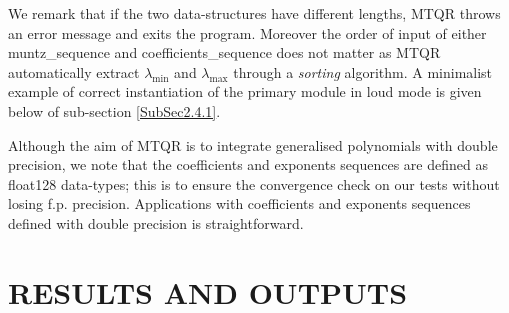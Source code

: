 \documentclass[a4paper, twosided]{book}
\begin{document}
\noindent
We remark that if the two data-structures have different lengths, MTQR throws an error message and exits the program. Moreover the order of input of either \colorbox{poliGrayBlue}{muntz\_sequence} and \colorbox{poliGrayBlue}{coefficients\_sequence} does not matter as MTQR automatically extract $\lambda_{\text{min}}$ and $\lambda_{\text{max}}$ through a \textsl{sorting} algorithm. A minimalist example of correct instantiation of the primary module in loud mode is given below of sub-section \ref{SubSec2.4.1}.


\noindent
Although the aim of MTQR is to integrate generalised polynomials with double precision, we note that the coefficients and exponents sequences are defined as \colorbox{poliGrayBlue}{float128} data-types; this is to ensure the convergence check on our tests without losing f.p. precision. Applications with coefficients and exponents sequences defined with double precision is straightforward.

\section[Results and outputs]{\changefont RESULTS AND OUTPUTS}\label{Sec3.2}
\end{document}

